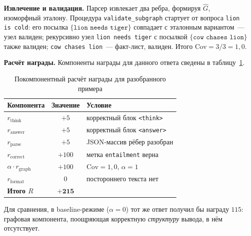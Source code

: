 \textbf{Извлечение и валидация.} Парсер извлекает два ребра, формируя $\hat{G}$, изоморфный эталону. Процедура \texttt{validate\_subgraph} стартует от вопроса \texttt{lion is cold}: его посылка $\{\texttt{lion needs tiger}\}$ совпадает с эталонным вариантом~--- узел валиден; рекурсивно узел \texttt{lion needs tiger} с посылкой $\{\texttt{cow chases lion}\}$ также валиден; \texttt{cow chases lion}~--- факт-лист, валиден. Итого $\mathrm{Cov} = 3/3 = 1{,}0$.

\textbf{Расчёт награды.} Компоненты награды для данного ответа сведены в таблицу~\ref{tab:reward-example}.

\begin{table}[H]
\centering
\caption{Покомпонентный расчёт награды для разобранного примера}
\label{tab:reward-example}
\begin{tabular}{|l|c|l|}
\hline
\textbf{Компонента} & \textbf{Значение} & \textbf{Условие} \\
\hline
$r_{\text{think}}$   & $+5$   & корректный блок \texttt{<think>} \\
$r_{\text{answer}}$  & $+5$   & корректный блок \texttt{<answer>} \\
$r_{\text{parse}}$   & $+5$   & JSON-массив рёбер разобран \\
$r_{\text{correct}}$ & $+100$ & метка \texttt{entailment} верна \\
$\alpha\cdot r_{\text{graph}}$ & $+100$ & $\mathrm{Cov}=1{,}0$, $\alpha=1$ \\
$r_{\text{format}}$  & $0$    & постороннего текста нет \\
\hline
\textbf{Итого $R$}   & $\mathbf{+215}$ & \\
\hline
\end{tabular}
\end{table}

Для сравнения, в baseline-режиме ($\alpha = 0$) тот же ответ получил бы награду $115$: графовая компонента, поощряющая корректную \emph{структуру} вывода, в нём отсутствует.

